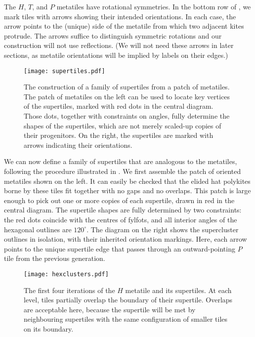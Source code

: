 The $H$, $T$, and $P$ metatiles have rotational symmetries.
In the bottom row of , we mark tiles
with arrows showing their intended orientations.  In each case, the
arrow points to the (unique) side of the metatile from which two adjacent
kites protrude.  The arrows suffice to distinguish symmetric rotations
and our construction will not use reflections. (We will not need these
arrows in later sections, as metatile orientations will be implied by 
labels on their edges.)

\begin{figure}[htp!]
\begin{center}
\texttt{[image: supertiles.pdf]}
\end{center}
\caption{\label{fig:supertiles}The construction of a family of 
	supertiles from a patch of metatiles.  The patch of metatiles on
	the left can be used to locate key vertices of the supertiles,
	marked with red dots in the central diagram.  Those dots, 
	together with constraints on angles, fully determine the shapes
	of the supertiles, which are not merely scaled-up copies of their
	progenitors.  On the right, the supertiles are marked with
	arrows indicating their orientations.}
\end{figure}

We can now define a family of supertiles that are analogous to the
metatiles, following the procedure illustrated in 
.  We first assemble the patch of oriented metatiles
shown on the left.  It can easily be checked that the elided
hat polykites borne by these tiles fit together with no gaps and no
overlaps.  This patch is large enough to pick out one
or more copies of 
each supertile, drawn in red in the central diagram.
The supertile shapes are fully determined by two constraints:
the red dots coincide with the centres of fylfots, and all interior angles
of the hexagonal outlines are $120^\circ$.  The diagram on the right 
shows the supercluster outlines in isolation, with their inherited
orientation markings.  Here, each arrow points to the unique supertile
edge that passes through an outward-pointing $P$ tile from the previous
generation.

\begin{figure}[ht!]
\begin{center}
\texttt{[image: hexclusters.pdf]}
\end{center}
\caption{\label{fig:hexclusters}The first four iterations of the 
	$H$ metatile and its supertiles.  At each level, tiles partially
	overlap the boundary of their supertile.  Overlaps are acceptable
	here, because the supertile will be met by neighbouring supertiles
	with the same configuration of smaller tiles on its boundary.}
\end{figure}


